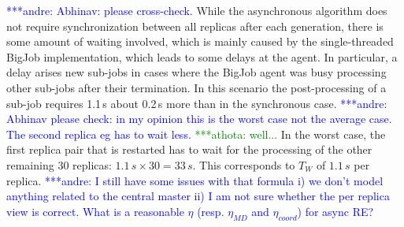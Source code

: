 \documentclass{rspublic}
\newcommand{\alnote}[1]{ {\textcolor{blue} { ***andre: #1 }}}
\newcommand{\athotanote}[1]{ {\textcolor{green} { ***athota: #1 }}}
\newcommand{\alnote}[1]{}
\newcommand{\athotanote}[1]{}
\begin{document}
 

\alnote{Abhinav: please cross-check.}  While the asynchronous
algorithm does not require synchronization between all replicas
after each generation, there is some amount of waiting involved, which
is mainly caused by the single-threaded BigJob implementation, which
leads to some delays at the agent.  In particular, a delay arises %
new sub-jobs in cases where the BigJob agent was busy processing other
sub-jobs after their termination. In this scenario the post-processing
of a sub-job requires 1.1\,s about 0.2\,s more than in the synchronous
case. \alnote{Abhinav please check: in my opinion this is the worst
  case not the average case. The second replica eg has to wait less.}
\athotanote{well...}  In the worst case, the first replica pair that
is restarted has to wait for the processing of the other remaining 30
replicas: $1.1\,s \times 30 = 33\,s$. This corresponds to $T_{W}$ of
$1.1\,s$ per replica.\alnote{I still have some issues with that
  formula i) we don't model anything related to the central master ii)
  I am not sure whether the per replica view is correct. What is a
  reasonable $\eta$ (resp. $\eta_{MD}$ and $\eta_{coord}$) for async
  RE?}
 
\end{document}
